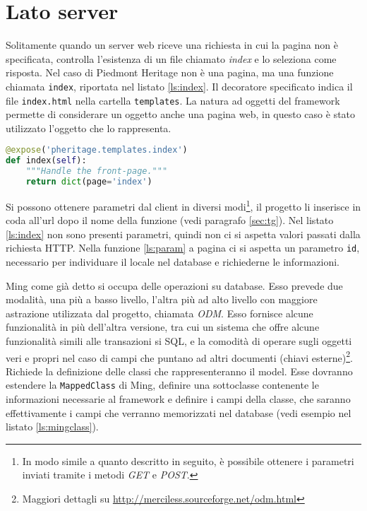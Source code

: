 \section{Lato server}
Solitamente quando un server web riceve una richiesta in cui la pagina non è specificata, controlla l'esistenza di un file chiamato \emph{index} e lo seleziona come risposta. Nel caso di Piedmont Heritage non è una pagina, ma una funzione chiamata \texttt{index}, riportata nel listato \ref{ls:index}. Il decoratore specificato indica il file \texttt{index.html} nella cartella \texttt{templates}. La natura ad oggetti del framework permette di considerare un oggetto anche una pagina web, in questo caso è stato utilizzato l'oggetto che lo rappresenta.
\begin{lstlisting}[label=ls:index,caption={root controller, funzione index, richiamata alla richiesta della pagina web da parte del client.},language=Python]
@expose('pheritage.templates.index')
def index(self):
    """Handle the front-page."""
    return dict(page='index')
\end{lstlisting}

Si possono ottenere parametri dal client in diversi modi\footnote{In modo simile a quanto descritto in seguito, è possibile ottenere i parametri inviati tramite i metodi \emph{GET} e \emph{POST}.}, il progetto li inserisce in coda all'url dopo il nome della funzione (vedi paragrafo \ref{sec:tg}). Nel listato \ref{ls:index} non sono presenti parametri, quindi non ci si aspetta valori passati dalla richiesta HTTP. Nella funzione \ref{ls:param} a pagina \pageref{ls:param} ci si aspetta un parametro \texttt{id}, necessario per individuare il locale nel database e richiederne le informazioni.

Ming come già detto si occupa delle operazioni su database. Esso prevede due modalità, una più a basso livello, l'altra più ad alto livello con maggiore astrazione utilizzata dal progetto, chiamata \emph{ODM}. Esso fornisce alcune funzionalità in più dell'altra versione, tra cui un sistema che offre alcune funzionalità simili alle transazioni si SQL, e la comodità di operare sugli oggetti veri e propri nel caso di campi che puntano ad altri documenti (chiavi esterne)\footnote{Maggiori dettagli su \url{http://merciless.sourceforge.net/odm.html}}. Richiede la definizione delle classi che rappresenteranno il model. Esse dovranno estendere la \texttt{MappedClass} di Ming, definire una sottoclasse contenente le informazioni necessarie al framework e definire i campi della classe, che saranno effettivamente i campi che verranno memorizzati nel database (vedi esempio nel listato \ref{ls:mingclass}).

